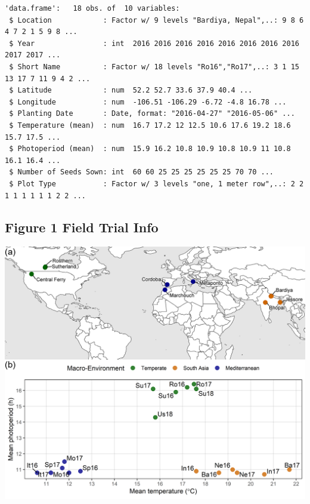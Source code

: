 \documentclass[
]{article}
\begin{document}
\begin{verbatim}
'data.frame':   18 obs. of  10 variables:
 $ Location            : Factor w/ 9 levels "Bardiya, Nepal",..: 9 8 6 4 7 2 1 5 9 8 ...
 $ Year                : int  2016 2016 2016 2016 2016 2016 2016 2016 2017 2017 ...
 $ Short Name          : Factor w/ 18 levels "Ro16","Ro17",..: 3 1 15 13 17 7 11 9 4 2 ...
 $ Latitude            : num  52.2 52.7 33.6 37.9 40.4 ...
 $ Longitude           : num  -106.51 -106.29 -6.72 -4.8 16.78 ...
 $ Planting Date       : Date, format: "2016-04-27" "2016-05-06" ...
 $ Temperature (mean)  : num  16.7 17.2 12 12.5 10.6 17.6 19.2 18.6 15.7 17.5 ...
 $ Photoperiod (mean)  : num  15.9 16.2 10.8 10.9 10.8 10.9 11 10.8 16.1 16.4 ...
 $ Number of Seeds Sown: int  60 60 25 25 25 25 25 25 70 70 ...
 $ Plot Type           : Factor w/ 3 levels "one, 1 meter row",..: 2 2 1 1 1 1 1 1 2 2 ...
\end{verbatim}

\hypertarget{figure-1-field-trial-info}{%
\subsection{Figure 1 Field Trial Info}\label{figure-1-field-trial-info}}

\includegraphics{Figure_01.png}
\end{document}
